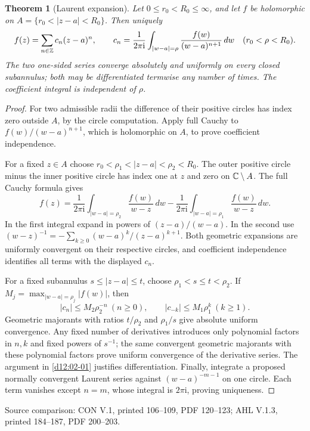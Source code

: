 \documentclass[11pt,a4paper,openany]{book}
\newtheorem{theorem}{Theorem}[chapter]
\theoremstyle{definition}
\theoremstyle{remark}\newtheorem{remark}[theorem]{Remark}
\newcommand{\dd}{\,d}\newcommand{\iu}{\mathrm i}
\newcommand{\family}[1]{}
\newcommand{\source}[1]{\par\begingroup\small\sffamily\color{black!65}Source comparison: #1\par\endgroup}
\begin{document}
\begin{theorem}[Laurent expansion]\family{D12.07.01}\label{d12:07-01}
Let \(0\le r_0<R_0\le\infty\), and let \(f\) be holomorphic on
\(A=\{r_0<|z-a|<R_0\}\). Then uniquely
\[
 f(z)=\sum_{n\in\Z}c_n(z-a)^n,\qquad
 c_n=\frac1{2\pi\iu}\int_{|w-a|=\rho}
                    \frac{f(w)}{(w-a)^{n+1}}\dd w
 \quad(r_0<\rho<R_0).
\]
The two one-sided series converge absolutely and uniformly on every
closed subannulus; both may be differentiated termwise any number of times.
The coefficient integral is independent of \(\rho\).
\end{theorem}
\begin{proof}
For two admissible radii the difference of their positive circles has
index zero outside \(A\), by the circle computation.
Apply full Cauchy to \(f(w)/(w-a)^{n+1}\), which is holomorphic on \(A\),
to prove coefficient independence.

For a fixed \(z\in A\) choose
\(r_0<\rho_1<|z-a|<\rho_2<R_0\).
The outer positive circle minus the inner positive circle has index
one at \(z\) and zero on \(\mathbb C\setminus A\).
The full Cauchy formula gives
\[
 f(z)=\frac1{2\pi\iu}\int_{|w-a|=\rho_2}\frac{f(w)}{w-z}\dd w
       -\frac1{2\pi\iu}\int_{|w-a|=\rho_1}\frac{f(w)}{w-z}\dd w.
\]
In the first integral expand in powers of \((z-a)/(w-a)\).
In the second use
\((w-z)^{-1}=-\sum_{k\ge0}(w-a)^k/(z-a)^{k+1}\).
Both geometric expansions are uniformly convergent on their respective
circles, and coefficient independence identifies all terms with the
displayed \(c_n\).

For a fixed subannulus \(s\le|z-a|\le t\), choose
\(\rho_1<s\le t<\rho_2\).
If \(M_j=\max_{|w-a|=\rho_j}|f(w)|\), then
\[
 |c_n|\le M_2\rho_2^{-n}\ (n\ge0),\qquad
 |c_{-k}|\le M_1\rho_1^k\ (k\ge1).
\]
Geometric majorants with ratios \(t/\rho_2\) and \(\rho_1/s\) give
absolute uniform convergence. Any fixed number of derivatives introduces
only polynomial factors in \(n,k\) and fixed powers of \(s^{-1}\);
the same convergent geometric majorants with these polynomial factors
prove uniform convergence of the derivative series. The argument in
\cref{d12:02-01} justifies differentiation.
Finally, integrate a proposed normally convergent Laurent series against
\((w-a)^{-m-1}\) on one circle. Each term vanishes except \(n=m\),
whose integral is \(2\pi\iu\), proving uniqueness.
\end{proof}
\source{CON V.1, printed 106--109, PDF 120--123; AHL V.1.3, printed 184--187, PDF 200--203.}
\end{document}
